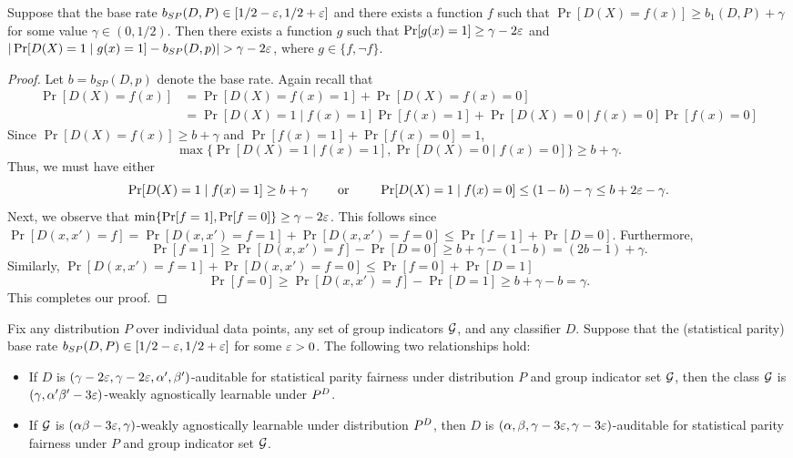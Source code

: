 \begin{lemma}\label{acc-dis2}
  Suppose that the base rate
  $b_{SP}(D, P) \in [1/2 - \varepsilon, 1/2 + \varepsilon]$ and there exists a
  function $f$ such that $\Pr[D(X) = f(x)] \geq b_1(D,P) + \gamma$ for
  some value $\gamma \in (0, 1/2)$. Then there exists a function $g$
  such that $\Pr[ g(x) = 1 ] \geq \gamma - 2\varepsilon$ and
  $|\Pr[D(X) = 1 \mid g(x) = 1] - b_{SP}(D, p)| > \gamma - 2\varepsilon$,
  where $g \in \{f, \neg f\}$.
\end{lemma}


\begin{proof}
  Let $b = b_{SP}(D, p)$ denote the base rate. Again recall that
  \begin{align*}
    \Pr[D(X) = f(x) ] &= \Pr[D(X) = f(x) = 1] +\Pr[D(X) =
                        f(x) = 0]\\
                      &= \Pr[D(X) = 1 \mid f(x) = 1]\Pr[f(x) = 1] + \Pr[D(X) = 0 \mid f(x) = 0] \Pr[f(x)=0]
  \end{align*}
  Since $\Pr[D(X) = f(x)] \geq b + \gamma$ and
  $\Pr[f(x) = 1] + \Pr[f(x) = 0] = 1$,
  \[
    \max\{ \Pr[D(X) = 1 \mid f(x) = 1], \Pr[D(X) = 0 \mid f(x)
    = 0]\} \geq b + \gamma.
  \]
  Thus, we must have either
\[
  \Pr[D(X) = 1 \mid f(x) = 1] \geq b+ \gamma \qquad \mbox{ or } \qquad
  \Pr[D(X) = 1 \mid f(x) = 0] \leq (1 - b) - \gamma\leq b + 2\varepsilon -
  \gamma.
\]
  Next, we observe that
  $\min\{\Pr[f=1] , \Pr[f=0]\} \geq \gamma - 2\varepsilon$. This follows
  since
  $\Pr[D(x,x') = f] = \Pr[D(x,x') = f = 1] + \Pr[D(x,x') = f = 0] \leq
  \Pr[f = 1] + \Pr[D = 0]$. Furthermore,
  $$
  \Pr[f = 1] \geq \Pr[D(x,x') = f] - \Pr[D = 0] \geq b + \gamma - (1-
  b) = (2b - 1) + \gamma.
  $$
  Similarly,
  $\Pr[D(x,x') = f = 1] + \Pr[D(x,x') = f = 0] \leq \Pr[f = 0] + \Pr[D
  = 1]$
  $$
  \Pr[f = 0] \geq \Pr[D(x,x') = f] - \Pr[D = 1] \geq b + \gamma - b =
  \gamma.
  $$
  This completes our proof.
\end{proof}


\begin{theorem}\label{thm:reduction1a}
  Fix any distribution $P$ over individual data points, any set of
  group indicators $\mathcal{G}$, and any classifier $D$.  Suppose that the
  (statistical parity) base rate
  $b_{SP}(D, P) \in [1/2 - \varepsilon, 1/2 + \varepsilon]$ for some $\varepsilon > 0$. The
  following two relationships hold:
\begin{itemize}

\item If $D$ is
  $(\gamma - 2\varepsilon, \gamma - 2\varepsilon, \alpha', \beta')$-auditable for
  statistical parity fairness under distribution $P$ and group
  indicator set $\mathcal{G}$, then the class $\mathcal{G}$ is
  $(\gamma, \alpha'\beta' - 3\varepsilon)$-weakly agnostically learnable under
  $P^D$.


\item If $\mathcal{G}$ is $(\alpha\beta - 3\varepsilon, \gamma)$-weakly agnostically
  learnable under distribution $P^D$, then $D$ is
  $(\alpha, \beta, \gamma- 3\varepsilon, \gamma - 3\varepsilon)$-auditable for statistical
  parity fairness under $P$ and group indicator set $\mathcal{G}$.
\end{itemize}

\end{theorem}



